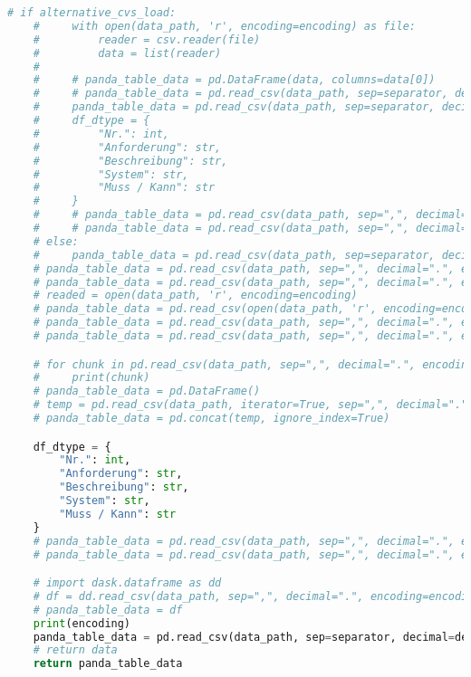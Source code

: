 \begin{lstlisting}[language=python, caption=pandas_dataframe_to_latex_table.py CSV - LaTex Tabelle,captionpos=b,label={lst:Python LaTex - pandas_dataframe_to_latex_table},breaklines=true]
    # if alternative_cvs_load:
    #     with open(data_path, 'r', encoding=encoding) as file:
    #         reader = csv.reader(file)
    #         data = list(reader)
    #
    #     # panda_table_data = pd.DataFrame(data, columns=data[0])
    #     # panda_table_data = pd.read_csv(data_path, sep=separator, decimal=decimal, encoding=encoding, lineterminator='\n', engine='python')
    #     panda_table_data = pd.read_csv(data_path, sep=separator, decimal=decimal, encoding=encoding, lineterminator='\n')
    #     df_dtype = {
    #         "Nr.": int,
    #         "Anforderung": str,
    #         "Beschreibung": str,
    #         "System": str,
    #         "Muss / Kann": str
    #     }
    #     # panda_table_data = pd.read_csv(data_path, sep=",", decimal=".", encoding=encoding, lineterminator='\n', dtype=df_dtype)
    #     # panda_table_data = pd.read_csv(data_path, sep=",", decimal=".", encoding=encoding)
    # else:
    #     panda_table_data = pd.read_csv(data_path, sep=separator, decimal=decimal, encoding=encoding)
    # panda_table_data = pd.read_csv(data_path, sep=",", decimal=".", encoding=encoding, low_memory=False, engine='python')
    # panda_table_data = pd.read_csv(data_path, sep=",", decimal=".", encoding=encoding, engine='python', dtype='unicode')
    # readed = open(data_path, 'r', encoding=encoding)
    # panda_table_data = pd.read_csv(open(data_path, 'r', encoding=encoding), sep=",", decimal=".", encoding=encoding)
    # panda_table_data = pd.read_csv(data_path, sep=",", decimal=".", encoding = "ISO-8859-1")
    # panda_table_data = pd.read_csv(data_path, sep=",", decimal=".", encoding=encoding, chunksize=10)

    # for chunk in pd.read_csv(data_path, sep=",", decimal=".", encoding=encoding, chunksize=5):
    #     print(chunk)
    # panda_table_data = pd.DataFrame()
    # temp = pd.read_csv(data_path, iterator=True, sep=",", decimal=".", encoding=encoding, chunksize=1000)
    # panda_table_data = pd.concat(temp, ignore_index=True)

    df_dtype = {
        "Nr.": int,
        "Anforderung": str,
        "Beschreibung": str,
        "System": str,
        "Muss / Kann": str
    }
    # panda_table_data = pd.read_csv(data_path, sep=",", decimal=".", encoding=encoding, engine='python', dtype=df_dtype)
    # panda_table_data = pd.read_csv(data_path, sep=",", decimal=".", encoding=encoding, dtype=df_dtype)

    # import dask.dataframe as dd
    # df = dd.read_csv(data_path, sep=",", decimal=".", encoding=encoding)
    # panda_table_data = df
    print(encoding)
    panda_table_data = pd.read_csv(data_path, sep=separator, decimal=decimal, encoding=encoding)
    # return data
    return panda_table_data



\end{lstlisting}
